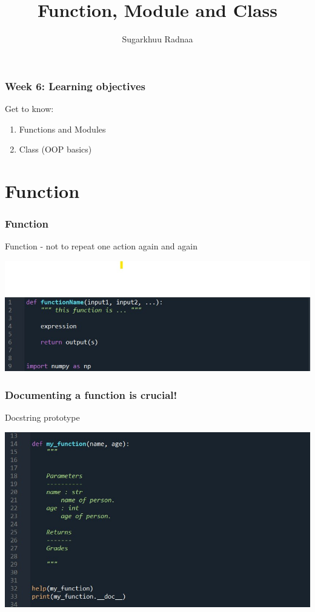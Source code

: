 \documentclass{beamer}
\title[Introduction to Python]{Function, Module and Class}
\author{Sugarkhuu Radnaa}
\institute[]
{
Py4Econ in Ulaanbaatar \\ 
\medskip
\textit{py4econ@gmail.com} 
}
\date{}  %
\begin{document}
\begin{frame}
\titlepage %
\end{frame}

\begin{frame}
    \frametitle{Week 6: Learning objectives}
    Get to know: 
    \begin{enumerate}
        \item Functions and Modules
        \item Class (OOP basics)         
    \end{enumerate}
\end{frame}


\section{Function} 

\begin{frame}
    \frametitle{Function}
    Function - not to repeat one action again and again
        \begin{center}
            \includegraphics[scale=0.5]{figures/function.jpg}
        \end{center}        
    \end{frame}
    
    \begin{frame}
    \frametitle{Documenting a function is crucial!}
    Docstring prototype
            \begin{center}
                \includegraphics[scale=0.5]{figures/documentation.jpg}
            \end{center}
    \end{frame}
    
\end{document}
